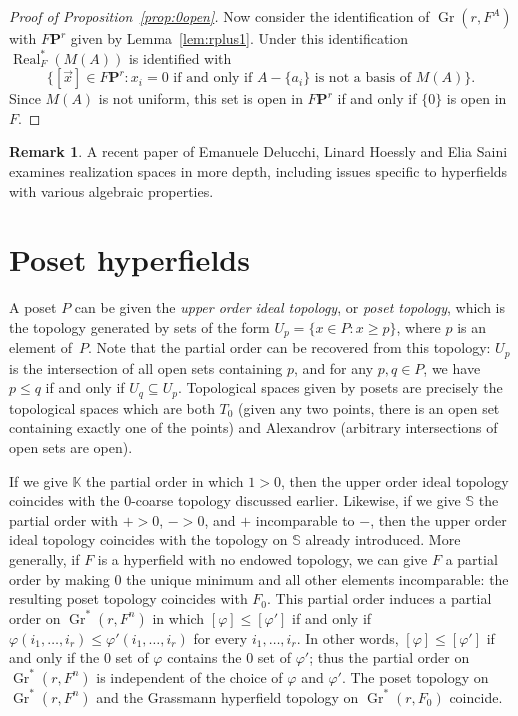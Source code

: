 \documentclass[10pt, preprint]{article}
\theoremstyle{definition}
\newtheorem{remark}[theorem]{Remark}
\begin{document}
\begin{proof}[Proof of Proposition~\ref{prop:0open}]
Now consider the identification of $\operatorname{Gr}(r, F^{A})$ with
$F\mathbf{P}^{r}$ given by Lemma~\ref{lem:rplus1}. Under this
identification $\operatorname{Real}_{F}^{*}(M(A))$ is identified with
%
\begin{equation*}
\{[\vec{x}] \in F\mathbf{P}^{r} : x_{i} = 0
\text{ if and only if $A-\{a_{i}\}$ is not a basis of $M(A)$}\}.
\end{equation*}
%
Since $M(A)$ is not uniform, this set is open in $F\mathbf{P}^{r}$ if
and only if $\{0\}$ is open in $F$.
\end{proof}

\begin{remark}
A recent paper of Emanuele Delucchi, Linard Hoessly and Elia Saini
\cite{Delucchi-Saini} examines realization spaces in more depth,
including issues specific to hyperfields with various algebraic
properties.
\end{remark}

\section{Poset hyperfields}%
\label{sec:posets}

A poset $P$ can be given the \emph{upper order ideal topology}, or
\emph{poset topology}, which is the topology generated by sets of the
form $U_{p}=\{x\in P: x\geq p\}$, where $p$ is an element of~$P$. Note
that the partial order can be recovered from this topology:
$U_{p}$ is the intersection of all open sets containing $p$, and for any
$p,q\in P$, we have $p\leq q$ if and only if $U_{q}\subseteq U_{p}$.
Topological spaces given by posets are precisely the topological spaces
which are both $T_{0}$ (given any two points, there is an open set
containing exactly one of the points) and Alexandrov (arbitrary
intersections of open sets are open).

If we give $\mathbb{K}$ the partial order in which $1>0$, then the upper
order ideal topology coincides with the 0-coarse topology discussed
earlier. Likewise, if we give $\mathbb{S}$ the partial order with
$+>0$, $->0$, and $+$ incomparable to $-$, then the upper order ideal
topology coincides with the topology on $\mathbb{S}$ already introduced.
More generally, if $F$ is a hyperfield with no endowed topology, we can
give $F$ a partial order by making $0$ the unique minimum and all other
elements incomparable: the resulting poset topology coincides with
$F_{0}$. This partial order induces a partial order on $
\operatorname{Gr}^{*}(r, F^{n})$ in which $[\varphi ]\leq [\varphi ']$
if and only if $\varphi (i_{1},\ldots ,i_{r})\leq \varphi '(i_{1},
\ldots , i_{r})$ for every $i_{1}, \ldots , i_{r}$. In other words,
$[\varphi ]\leq [\varphi ']$ if and only if the 0 set of $\varphi $
contains the 0 set of $\varphi '$; thus the partial order on
$\operatorname{Gr}^{*}(r, F^{n})$ is independent of the choice of
$\varphi $ and $\varphi '$. The poset topology on $\operatorname{Gr}
^{*}(r,F^{n})$ and the Grassmann hyperfield topology on $
\operatorname{Gr}^{*}(r,F_{0})$ coincide.
\end{document}
